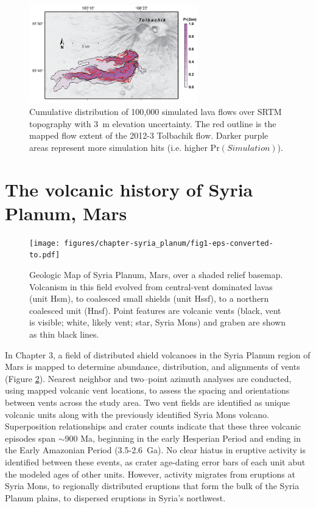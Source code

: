 \begin{figure}[hb!]
	\centering
	\includegraphics[width=0.65\textwidth]{figures/chapter-molasses/MC_probmap_300dpi}
	\caption{Cumulative distribution of 100,000 simulated lava flows over SRTM topography with 3~m elevation uncertainty. The red outline is the mapped flow extent of the 2012-3 Tolbachik flow. Darker purple areas represent more simulation hits (i.e. higher $\text{Pr}(Simulation)$).}
	\label{fig_MC_map}
\end{figure}

\section{The volcanic history of Syria Planum, Mars}

\begin{figure}[h]
	\centering
	\texttt{[image: figures/chapter-syria\_planum/fig1-eps-converted-to.pdf]}
	\caption{Geologic Map of Syria Planum, Mars, over a shaded relief basemap. Volcanism in this field evolved from central-vent dominated lavas (unit Hsm), to coalesced small shields (unit Hssf), to a northern coalesced unit (Hnsf). Point features are volcanic vents (black, vent is visible; white, likely vent; star, Syria Mons) and graben are shown as thin black lines.}
	\label{fig-geomap}
\end{figure}

In Chapter 3, a field of distributed shield volcanoes in the Syria Planum region of Mars is mapped to determine abundance, distribution, and alignments of vents (Figure \ref{fig-geomap}). Nearest neighbor and two--point azimuth analyses are conducted, using mapped volcanic vent locations, to assess the spacing and orientations between vents across the study area. Two vent fields are identified as unique volcanic units along with the previously identified Syria Mons volcano. Superposition relationships and crater counts indicate that these three volcanic episodes span $\sim$900 Ma, beginning in the early Hesperian Period and ending in the Early Amazonian Period (3.5-2.6~Ga). No clear hiatus in eruptive activity is identified between these events, as crater age-dating error bars of each unit abut the modeled ages of other units. However, activity migrates from eruptions at Syria Mons, to regionally distributed eruptions that form the bulk of the Syria Planum plains, to dispersed eruptions in Syria's northwest. 


